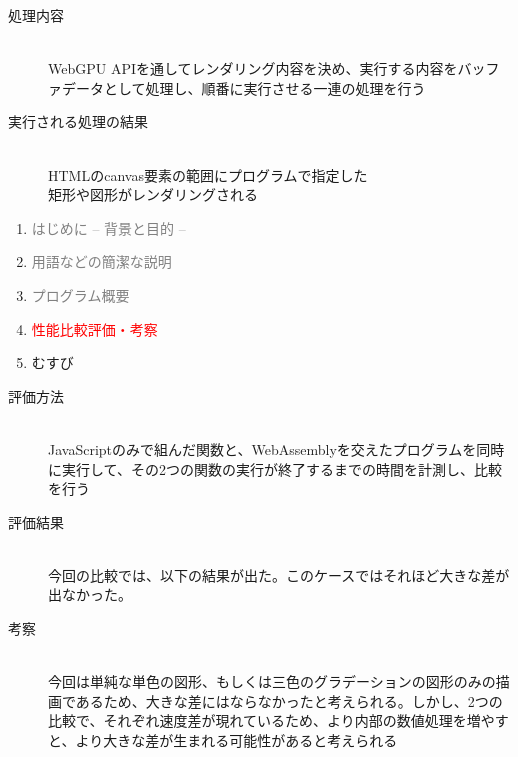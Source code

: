 \begin{description}

	\item[処理内容]~\\
	WebGPU APIを通してレンダリング内容を決め、実行する内容をバッファデータとして処理し、順番に実行させる一連の処理を行う
	\item[実行される処理の結果]~\\
	HTMLのcanvas要素の範囲にプログラムで指定した\\矩形や図形がレンダリングされる

\end{description}
\newpage

\begin{enumerate}[itemsep=0.25\zh]
	\item \textcolor{gray}{はじめに -- 背景と目的 --}
	\item \textcolor{gray}{用語などの簡潔な説明}
	\item \textcolor{gray}{プログラム概要}
	\item \textcolor{red}{性能比較評価・考察}
	\item むすび
\end{enumerate}
\newpage


\begin{description}
	
	\item[評価方法]~\\
	JavaScriptのみで組んだ関数と、WebAssemblyを交えたプログラムを同時に実行して、その2つの関数の実行が終了するまでの時間を計測し、比較を行う
	\newpage
	\item[評価結果]~\\
	今回の比較では、以下の結果が出た。このケースではそれほど大きな差が出なかった。
	\item[考察]~\\
	今回は単純な単色の図形、もしくは三色のグラデーションの図形のみの描画であるため、大きな差にはならなかったと考えられる。しかし、2つの比較で、それぞれ速度差が現れているため、より内部の数値処理を増やすと、より大きな差が生まれる可能性があると考えられる
	
\end{description}


